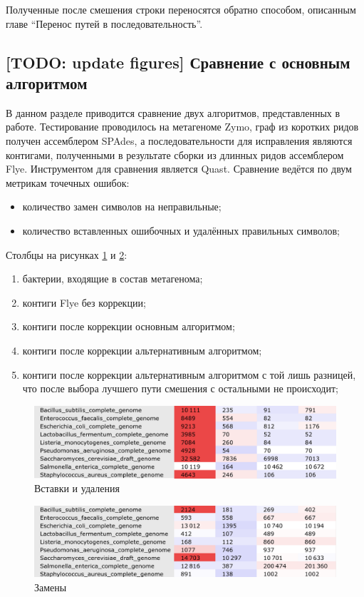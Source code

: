 \documentclass[14pt]{matmex-diploma-custom}
\begin{document}
Полученные после смешения строки переносятся обратно способом, описанным главе ``Перенос путей в последовательность''.

\subsection{[TODO: update figures] Сравнение с основным алгоритмом }
В данном разделе приводится сравнение двух алгоритмов, представленных в работе. Тестирование проводилось на метагеноме Zymo, граф из коротких ридов получен ассемблером SPAdes, а последовательности для исправления являются контигами, полученными в результате сборки из длинных ридов ассемблером Flye. Инструментом для сравнения является Quast. Сравнение ведётся по двум метрикам точечных ошибок: 
\begin{itemize}
    \item количество замен символов на неправильные;
    \item количество вставленных ошибочных и удалённых правильных символов;
\end{itemize}

Столбцы на рисунках \ref{fig:indels_ga} и \ref{fig:mismatches_ga}:
\begin{enumerate}
    \item бактерии, входящие в состав метагенома;
    \item контиги Flye без коррекции;
    \item контиги после коррекции основным алгоритмом;
    \item контиги после коррекции альтернативным алгоритмом;
    \item контиги после коррекции альтернативным алгоритмом с той лишь разницей, что после выбора лучшего пути смешения с остальными не происходит;
\end{enumerate}

\begin{figure}[h]
    \centering
    \includegraphics[width=1\textwidth]{indels_ga_full.png}
    \caption{Вставки и удаления}
    \label{fig:indels_ga}
\end{figure}

\begin{figure}[h]
    \centering
    \includegraphics[width=1\textwidth]{mismatches_ga_full.png}
    \caption{Замены}
    \label{fig:mismatches_ga}
\end{figure}
\end{document}
